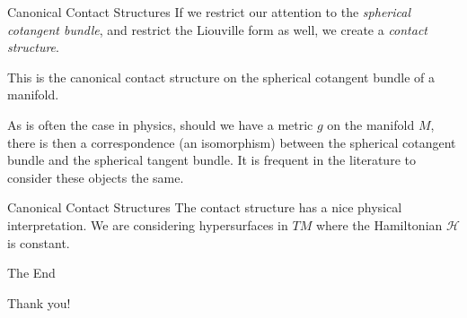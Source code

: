 \documentclass{beamer}
\begin{document}
    \begin{frame}{Canonical Contact Structures}
        If we restrict our attention to the \textit{spherical cotangent bundle},
        and restrict the Liouville form as well, we create a
        \textit{contact structure}.
        \par\hfill\par
        This is the canonical contact structure on the spherical cotangent
        bundle of a manifold.
        \par\hfill\par
        As is often the case in physics, should we have a metric $g$ on the
        manifold $M$, there is then a correspondence (an isomorphism) between
        the spherical cotangent bundle and the spherical tangent bundle.
        It is frequent in the literature to consider these objects the same.
    \end{frame}
    \begin{frame}{Canonical Contact Structures}
        The contact structure has a nice physical interpretation. We are
        considering hypersurfaces in $TM$ where the Hamiltonian $\mathcal{H}$
        is constant.
    \end{frame}
    \begin{frame}{The End}
        \begin{center}
            Thank you!
        \end{center}
    \end{frame}
\end{document}
